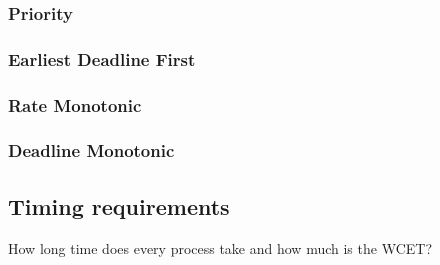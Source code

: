 \subsubsection{Priority}
\subsubsection{Earliest Deadline First}
\subsubsection{Rate Monotonic}
\subsubsection{Deadline Monotonic}

\subsection{Timing requirements}
How long time does every process take and how much is the WCET?